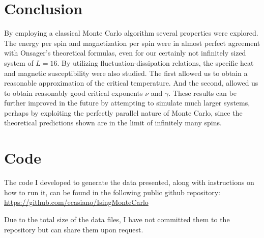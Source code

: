 \documentclass[12pt]{article}
\begin{document}
\section{Conclusion}

By employing a classical Monte Carlo algorithm several properties were explored. The energy per spin and magnetization per spin were in almost perfect agreement with Onsager's theoretical formulas, even for our certainly not infinitely sized system of $L=16$. By utilizing fluctuation-dissipation relations, the specific heat and magnetic susceptibility were also studied. The first allowed us to obtain a reasonable approximation of the critical temperature. And the second, allowed us to obtain reasonably good critical exponents $\nu$ and $\gamma$. These results can be further improved in the future by attempting to simulate much larger systems, perhaps by exploiting the perfectly parallel nature of Monte Carlo, since the theoretical predictions shown are in the limit of infinitely many spins.

\section{Code}

The code I developed to generate the data presented, along with instructions on how to run it, can be found in the following public github repository: \url{https://github.com/ecasiano/IsingMonteCarlo}

Due to the total size of the data files, I have not committed them to the repository but can share them upon request.




%
 
\end{document}
